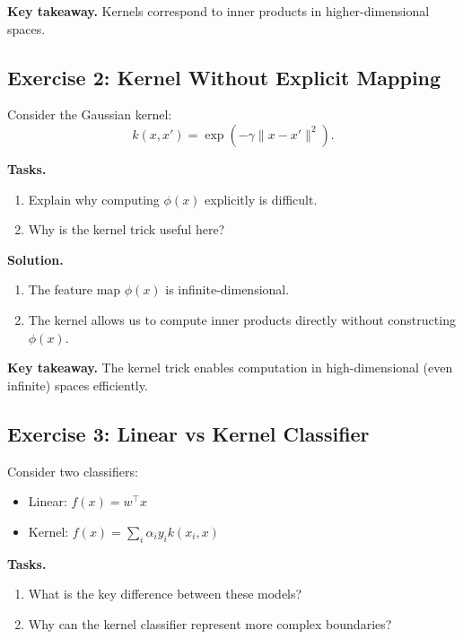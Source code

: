 \medskip

\noindent
\textbf{Key takeaway.}  
Kernels correspond to inner products in higher-dimensional spaces.

\subsection{Exercise 2: Kernel Without Explicit Mapping}

Consider the Gaussian kernel:
\[
k(x,x') = \exp(-\gamma \|x - x'\|^2).
\]

\medskip

\noindent
\textbf{Tasks.}
\begin{enumerate}
    \item Explain why computing $\phi(x)$ explicitly is difficult.
    \item Why is the kernel trick useful here?
\end{enumerate}

\medskip

\noindent
\textbf{Solution.}

\begin{enumerate}
\item The feature map $\phi(x)$ is infinite-dimensional.

\item The kernel allows us to compute inner products directly without constructing $\phi(x)$.
\end{enumerate}

\medskip

\noindent
\textbf{Key takeaway.}  
The kernel trick enables computation in high-dimensional (even infinite) spaces efficiently.

\subsection{Exercise 3: Linear vs Kernel Classifier}

Consider two classifiers:

\begin{itemize}
    \item Linear: $f(x) = w^\top x$
    \item Kernel: $f(x) = \sum_i \alpha_i y_i k(x_i, x)$
\end{itemize}

\medskip

\noindent
\textbf{Tasks.}
\begin{enumerate}
    \item What is the key difference between these models?
    \item Why can the kernel classifier represent more complex boundaries?
\end{enumerate}

